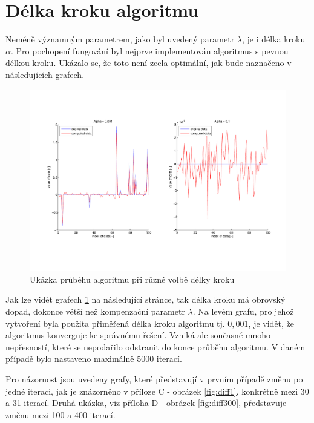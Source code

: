 \documentclass[FM,BP]{tulthesis}
\begin{document}
\section{Délka kroku algoritmu}
\label{subch:dynamicStep}
Neméně významným parametrem, jako byl uvedený parametr $ \lambda $, je i délka kroku $ \alpha $. Pro pochopení fungování byl nejprve implementován algoritmus s pevnou délkou kroku. Ukázalo se, že toto není zcela optimální, jak bude naznačeno v následujících grafech.

\begin{figure}[!ht]
\begin{center}
\includegraphics[scale=0.55]{obr/basic.pdf}
\end{center}
\caption{Ukázka průběhu algoritmu při různé volbě délky kroku}
\label{fig:basicAlpha}
\end{figure} 

Jak lze vidět grafech \ref{fig:basicAlpha} na následující stránce, tak délka kroku má obrovský dopad, dokonce větší než kompenzační parametr $\lambda$. Na levém grafu, pro jehož vytvoření byla použita přiměřená délka kroku algoritmu tj. $0,001$, je vidět, že algoritmus konverguje ke správnému řešení. Vzniká ale současně mnoho nepřesností, které se nepodařilo odstranit do konce průběhu algoritmu. V daném případě bylo nastaveno maximálně 5000 iterací. 

Pro názornost jsou uvedeny grafy, které představují v prvním případě změnu po jedné iteraci, jak je znázorněno v příloze C - obrázek \ref{fig:diff1}, konkrétně mezi 30 a 31 iterací. Druhá ukázka, viz příloha D - obrázek \ref{fig:diff300}, představuje změnu mezi 100 a 400 iterací. 
\end{document}
